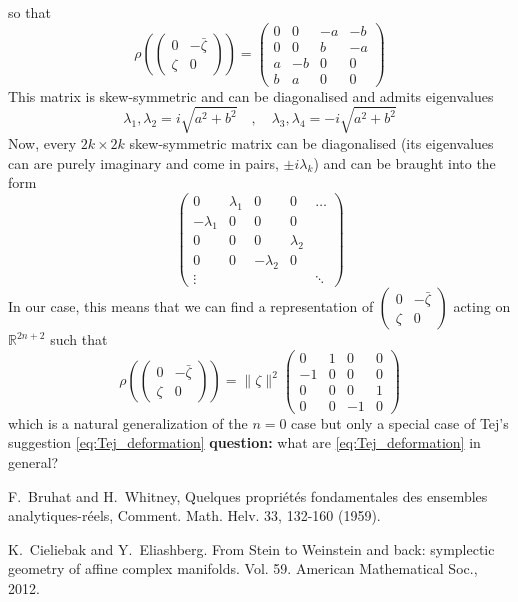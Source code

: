 \documentclass[a4paper,11pt]{article}
\theoremstyle{definition}
\newcommand{\RR}{\mathbb{R}}
\newcommand{\mat}[4]{\begin{pmatrix} #1 & #2 \\ #3 & #4 \end{pmatrix}}
\begin{document}
so that 
\begin{equation}
  \rho\left( \mat{0}{-\bar\zeta}{\zeta}{0} \right) = 
  \begin{pmatrix} 0 & 0 & - a & -b \\ 0 & 0 & b & -a  \\ a & -b & 0 & 0 \\ b & a & 0 & 0 \end{pmatrix}  
\end{equation}
This matrix is skew-symmetric and can be diagonalised and admits eigenvalues 
\begin{equation}
  \lambda_1, \lambda_2 = i \sqrt{a^2 + b^2} \quad , \quad \lambda_3, \lambda_4 = - i \sqrt{a^2 + b^2}
\end{equation}
Now, every $2k \times 2k$ skew-symmetric matrix can be diagonalised (its eigenvalues can are purely imaginary and come in pairs, $\pm i\lambda_k$) and can be braught into the form 
\begin{equation}
  \begin{pmatrix}  
  0 & \lambda_1 & 0 & 0 & \dots \\ 
  -\lambda_1 & 0 & 0 & 0 &  \\
  0 & 0 & 0 & \lambda_2 &  \\ 
  0 & 0 & -\lambda_2 & 0 &  \\
  \vdots & & & & \ddots
\end{pmatrix}
\end{equation}
In our case, this means that we can find a representation of $\mat{0}{-\bar\zeta}{\zeta}{0}$ acting on $\RR^{2n + 2}$ such that 
\begin{equation}
  \rho\left( \mat{0}{-\bar\zeta}{\zeta}{0} \right) = \lVert \zeta \rVert^2
  \begin{pmatrix}  
  0 & 1 & 0 & 0  \\ 
  -1 & 0 & 0 & 0  \\
  0 & 0 & 0 & 1  \\ 
  0 & 0 & -1 & 0 
\end{pmatrix}
\end{equation}
which is a natural generalization of the $n=0$ case but only a special case of Tej's suggestion \eqref{eq:Tej_deformation}
\textbf{\color{red} question:} what are \eqref{eq:Tej_deformation} in general?


\begin{thebibliography}{99}
   F.\ Bruhat and H.\ Whitney, Quelques propri\'et\'es fondamentales des ensembles analytiques-r\'eels, Comment. Math. Helv. 33, 132-160 (1959).

   K.\ Cieliebak and Y.\ Eliashberg. From Stein to Weinstein and back: symplectic geometry of affine complex manifolds. Vol. 59. American Mathematical Soc., 2012.
\end{thebibliography}
\end{document}
